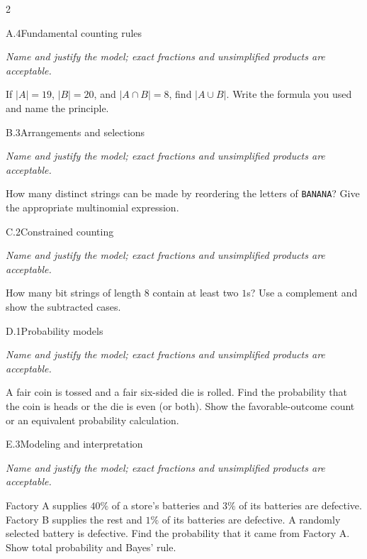 \documentclass[9pt]{extarticle}
\begin{document}
\CoreWorkArea
\FormBreak
{}
\begin{multicols}{2}
\begin{CoreProblem}{A.4}{Fundamental counting rules}
{\scriptsize\textit{Name and justify the model; exact fractions and unsimplified products are acceptable.}\par}
If $|A|=19$, $|B|=20$, and $|A\cap B|=8$, find $|A\cup B|$. Write
    the formula you used and name the principle.
\end{CoreProblem}
\begin{CoreProblem}{B.3}{Arrangements and selections}
{\scriptsize\textit{Name and justify the model; exact fractions and unsimplified products are acceptable.}\par}
How many distinct strings can be made by reordering the letters of
    \texttt{BANANA}? Give the appropriate multinomial expression.
\end{CoreProblem}
\begin{CoreProblem}{C.2}{Constrained counting}
{\scriptsize\textit{Name and justify the model; exact fractions and unsimplified products are acceptable.}\par}
How many bit strings of length 8 contain at least two $1$s? Use a
    complement and show the subtracted cases.
\end{CoreProblem}
\columnbreak
\begin{CoreProblem}{D.1}{Probability models}
{\scriptsize\textit{Name and justify the model; exact fractions and unsimplified products are acceptable.}\par}
A fair coin is tossed and a fair six-sided die is rolled. Find the
    probability that the coin is heads or the die is even (or both). Show the
    favorable-outcome count or an equivalent probability calculation.
\end{CoreProblem}
\begin{CoreProblem}{E.3}{Modeling and interpretation}
{\scriptsize\textit{Name and justify the model; exact fractions and unsimplified products are acceptable.}\par}
Factory A supplies $40\%$ of a store's batteries and $3\%$ of its
    batteries are defective. Factory B supplies the rest and $1\%$ of its
    batteries are defective. A randomly selected battery is defective. Find the
    probability that it came from Factory A. Show total probability and Bayes'
    rule.
\end{CoreProblem}
\end{multicols}
\CoreWorkArea
\end{document}
